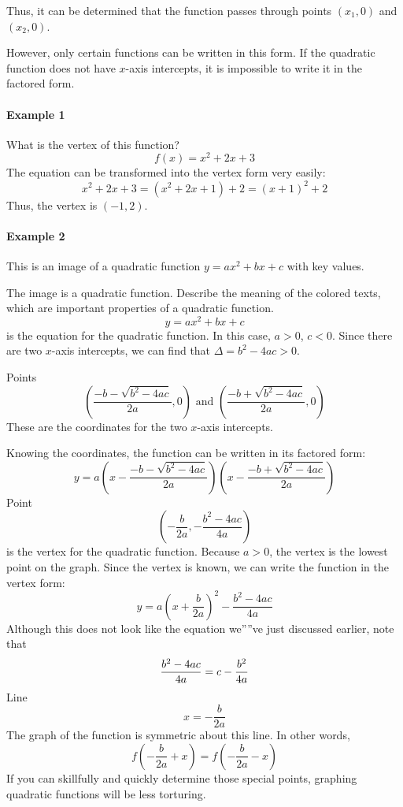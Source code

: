 Thus, it can be determined that the function passes through points $(x_1, 0)$ and $(x_2, 0)$.

However, only certain functions can be written in this form. If the quadratic function does not have $x$-axis intercepts, it is impossible to write it in the factored form.

\paragraph{Example 1}

What is the vertex of this function? 
$$
f(x) = x^2 + 2x + 3
$$
The equation can be transformed into the vertex form very easily:
$$
x^2 + 2x + 3 = (x^2 + 2x + 1) + 2 = (x + 1)^2 + 2
$$
Thus, the vertex is $(-1, 2)$.

\paragraph{Example 2}

This is an image of a quadratic function $y = ax^2 + bx + c$ with key values. 


The image is a quadratic function. Describe the meaning of the colored texts, which are important properties of a quadratic function.
$$
y = ax^2 + bx + c
$$
is the equation for the quadratic function. In this case, $a > 0$, $c < 0$. Since there are two $x$-axis intercepts, we can find that $\Delta = b^2 - 4ac > 0$.

Points 
$$
\left(\frac{-b - \sqrt{b^2 - 4ac}}{2a}, 0\right) \text{ and } \left(\frac{-b + \sqrt{b^2 - 4ac}}{2a}, 0\right)
$$
These are the coordinates for the two $x$-axis intercepts.

Knowing the coordinates, the function can be written in its factored form:
$$
y = a \left(x - \frac{-b - \sqrt{b^2 - 4ac}}{2a}\right) \left(x - \frac{-b + \sqrt{b^2 - 4ac}}{2a}\right)
$$
Point 
$$
\left(-\frac{b}{2a}, -\frac{b^2 - 4ac}{4a}\right)
$$
is the vertex for the quadratic function. Because $a > 0$, the vertex is the lowest point on the graph. Since the vertex is known, we can write the function in the vertex form:
$$
y = a \left(x + \frac{b}{2a}\right)^2 - \frac{b^2 - 4ac}{4a}
$$
Although this does not look like the equation we''''ve just discussed earlier, note that 
$$
\- \frac{b^2 - 4ac}{4a} = c - \frac{b^2}{4a}
$$
Line 
$$
x = -\frac{b}{2a}
$$
The graph of the function is symmetric about this line. In other words,
$$
f\left(-\frac{b}{2a} + x\right) = f\left(-\frac{b}{2a} - x\right)
$$
If you can skillfully and quickly determine those special points, graphing quadratic functions will be less torturing.


